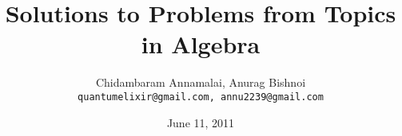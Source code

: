 \documentclass{article}
\begin{document}
\title{Solutions to Problems from Topics in Algebra}
\author{Chidambaram Annamalai, Anurag Bishnoi \\
\texttt{quantumelixir@gmail.com, annu2239@gmail.com}}
\date{June 11, 2011}
\maketitle





\end{document}
